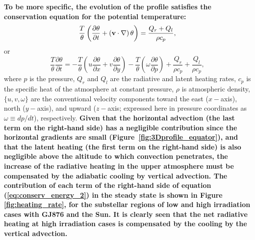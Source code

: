\documentclass[11pt,numberedappendix,twocolappendix,]{emulateapj}
\def\revise#1{{\bf #1}}
\begin{document}
\revise{To be more specific, the evolution of the profile satisfies the conservation equation for the potential temperature:}  
\begin{equation}
\frac{T}{\theta } \left( \frac{\partial \theta }{\partial t} + ( {\bf v} \cdot \nabla ) \, \theta \right) = \frac{ Q_r + Q_l }{\rho c_p} ,   \label{eq:conserv_energy}
\end{equation}
or
\begin{equation}
\frac{T}{\theta } \frac{\partial \theta }{\partial t} = - \frac{T}{\theta }\left( u \frac{\partial \theta }{\partial x} + v\frac{\partial \theta }{\partial y} \right) -\frac{T}{\theta } \left(  \omega \frac{\partial \theta }{\partial p} \right)  + \frac{ Q_r }{\rho c_p} + \frac{ Q_l }{\rho c_p}, \label{eq:conserv_energy_2}
\end{equation}
where $p$ is the pressure, $Q_r$ and $Q_l$ are the radiative and latent heating rates, $c_p$ is the specific heat of the atmosphere at constant pressure, $\rho $ is atmospheric density, $\{ u, v, \omega \}$ are the conventional velocity components toward the east ($x-$axis), north ($y-$axis), and upward ($z-$axis; expressed here in pressure coordinates as $\omega \equiv dp/dt$), respectively. 
%
\revise{Given that the horizontal advection (the last term on the right-hand side) has a negligible contribution since the horizontal gradients are small (Figure~\ref{fig:3Dprofile_equator}), and that the latent heating (the first term on the right-hand side) is also negligible above the altitude to which convection penetrates, the increase of the radiative heating in the upper atmosphere must be compensated by the adiabatic cooling by vertical advection. %
The contribution of each term of the right-hand side of equation (\ref{eq:conserv_energy_2}) in the steady state is shown in Figure \ref{fig:heating_rate}, for the substellar regions of low and high irradiation cases with GJ876 and the Sun. %
It is clearly seen that the net radiative heating at high irradiation cases is compensated by the cooling by the vertical advection. }
\end{document}
